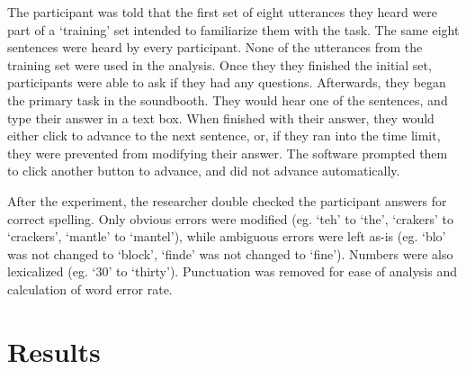 The participant was told that the first set of eight utterances they heard were part of a `training' set intended to familiarize them with the task. The same eight sentences were heard by every participant.  None of the utterances from the training set were used in the analysis.  Once they they finished the initial set, participants were able to ask if they had any questions.  Afterwards, they began the primary task in the soundbooth.  They would hear one of the sentences, and type their answer in a text box.  When finished with their answer, they would either click to advance to the next sentence, or, if they ran into the time limit, they were prevented from modifying their answer.  The software prompted them to click another button to advance, and did not advance automatically.

After the experiment, the researcher double checked the participant answers for correct spelling.  Only obvious errors were modified (eg. `teh' to `the', `crakers' to `crackers', `mantle' to `mantel'), while ambiguous errors were left as-is (eg. `blo' was not changed to `block', `finde' was not changed to `fine').  Numbers were also lexicalized (eg. `30' to `thirty').  Punctuation was removed for ease of analysis and calculation of word error rate.


\section{Results}
\label{chap3:results}


